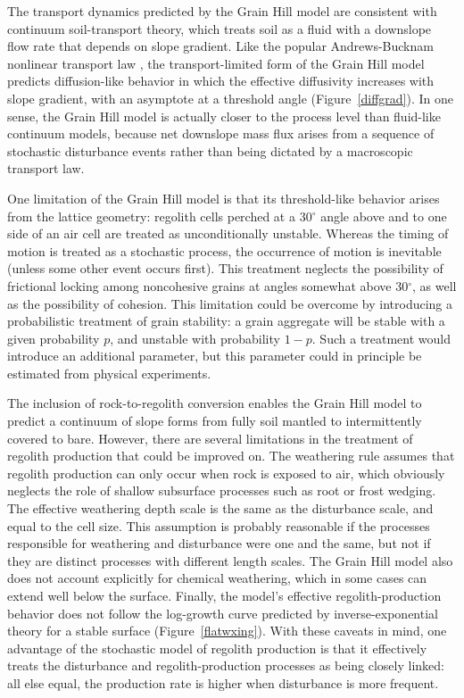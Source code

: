 \documentclass[esurf, manuscript]{copernicus}
\begin{document}
The transport dynamics predicted by the Grain Hill model are consistent with continuum soil-transport theory, which treats soil as a fluid with a downslope flow rate that depends on slope gradient. Like the popular Andrews-Bucknam nonlinear transport law \citep[e.g.,][]{andrews1987fitting,howard1994detachment,roering1999evidence}, the transport-limited form of the Grain Hill model predicts diffusion-like behavior in which the effective diffusivity increases with slope gradient, with an asymptote at a threshold angle (Figure~\ref{diffgrad}). In one sense, the Grain Hill model is actually closer to the process level than fluid-like continuum models, because net downslope mass flux arises from a sequence of stochastic disturbance events rather than being dictated by a macroscopic transport law.

One limitation of the Grain Hill model is that its threshold-like behavior arises from the lattice geometry: regolith cells perched at a 30$^\circ$ angle above and to one side of an air cell are treated as unconditionally unstable. Whereas the timing of motion is treated as a stochastic process, the occurrence of motion is inevitable (unless some other event occurs first). This treatment neglects the possibility of frictional locking among noncohesive grains at angles somewhat above 30$^\circ$, 
as well as the possibility of cohesion. This limitation could be overcome by introducing a probabilistic treatment of grain stability: a grain aggregate will be stable with a given probability $p$, and unstable with probability $1-p$. Such a treatment would introduce an additional parameter, but this parameter could in principle be estimated from physical experiments.

The inclusion of rock-to-regolith conversion enables the Grain Hill model to predict a continuum of slope forms from fully soil mantled to intermittently covered to bare. However, there are several limitations in the treatment of regolith production that could be improved on. The weathering rule assumes that regolith production can only occur when rock is exposed to air, which obviously neglects the role of shallow subsurface processes such as root or frost wedging. The effective weathering depth scale is the same as the disturbance scale, and equal to the cell size. This assumption is probably reasonable if the processes responsible for weathering and disturbance were one and the same, but not if they are distinct processes with different length scales. The Grain Hill model also does not account explicitly for chemical weathering, which in some cases can extend well below the surface. Finally, the model's effective regolith-production behavior does not follow the log-growth curve predicted by inverse-exponential theory for a stable surface (Figure~\ref{flatwxing}). With these caveats in mind, one advantage of the stochastic model of regolith production is that it effectively treats the disturbance and regolith-production processes as being closely linked: all else equal, the production rate is higher when disturbance is more frequent.
\end{document}
